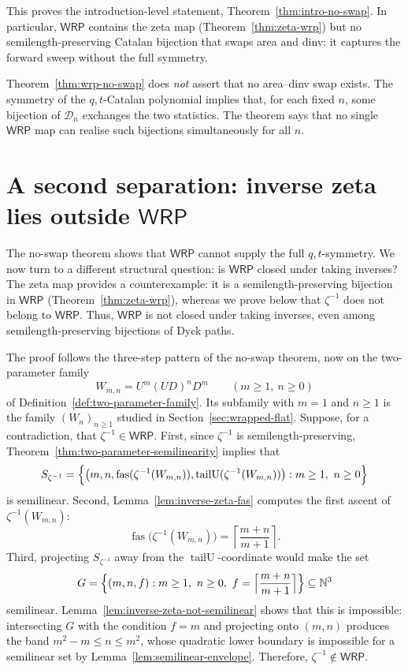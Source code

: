 \documentclass[11pt]{article}
\theoremstyle{definition}
\newcommand{\D}{\mathcal D}
\newcommand{\N}{\mathbb N}
\newcommand{\WRP}{\mathsf{WRP}}
\newcommand{\fas}{\operatorname{fas}}
\newcommand{\tailU}{\operatorname{tailU}}
\begin{document}
This proves the introduction-level statement, Theorem~\ref{thm:intro-no-swap}.
In particular, $\WRP$ contains the zeta map (Theorem~\ref{thm:zeta-wrp}) but no
semilength-preserving Catalan bijection that swaps area and dinv: it captures the
forward sweep without the full symmetry.

Theorem~\ref{thm:wrp-no-swap} does \emph{not} assert that no area--dinv
swap exists.  The symmetry of the $q,t$-Catalan polynomial implies that, for
each fixed $n$, some bijection of $\D_n$ exchanges the two statistics.  The
theorem says that no single $\WRP$ map can realise such bijections
simultaneously for all $n$.

\section[Inverse zeta lies outside WRP]
{A second separation: inverse zeta lies outside $\WRP$}
\label{sec:inverse-zeta}

The no-swap theorem shows that $\WRP$ cannot supply the full
$q,t$-symmetry.  We now turn to a different structural question: is $\WRP$
closed under taking inverses?  The zeta map provides a counterexample: it is a
semilength-preserving bijection in $\WRP$ (Theorem~\ref{thm:zeta-wrp}), whereas we
prove below that $\zeta^{-1}$ does not belong to $\WRP$.  Thus, $\WRP$ is not
closed under taking inverses, even among semilength-preserving bijections of Dyck
paths.

The proof follows the three-step pattern of the no-swap theorem, now on the
two-parameter family
\[
   W_{m,n}=U^m(UD)^nD^m\qquad(m\ge 1,\ n\ge 0)
\]
of Definition~\ref{def:two-parameter-family}.  Its subfamily with $m=1$ and $n\ge1$ is
the family $(W_n)_{n\ge1}$ studied in
Section~\ref{sec:wrapped-flat}.  Suppose, for a contradiction, that
$\zeta^{-1}\in\WRP$.  First, since $\zeta^{-1}$ is semilength-preserving,
Theorem~\ref{thm:two-parameter-semilinearity} implies that
\[
   S_{\zeta^{-1}}
   =\Bigl\{\bigl(m,n,\fas(\zeta^{-1}(W_{m,n})),
                    \tailU(\zeta^{-1}(W_{m,n}))\bigr):
                    m\ge1,\ n\ge0\Bigr\}
\]
is semilinear.  Second, Lemma~\ref{lem:inverse-zeta-fas} computes the first
ascent of $\zeta^{-1}(W_{m,n})$:
\[
   \fas\bigl(\zeta^{-1}(W_{m,n})\bigr)=\left\lceil\frac{m+n}{m+1}\right\rceil.
\]
Third, projecting $S_{\zeta^{-1}}$ away from the $\tailU$-coordinate would make
the set
\[
   G=\Bigl\{(m,n,f):m\ge1,\ n\ge0,\
          f=\Bigl\lceil\frac{m+n}{m+1}\Bigr\rceil\Bigr\}\subseteq\N^3
\]
semilinear.  Lemma~\ref{lem:inverse-zeta-not-semilinear} shows that this is impossible:
intersecting $G$ with the condition $f=m$ and projecting onto $(m,n)$ produces
the band $m^2-m\le n\le m^2$, whose quadratic lower boundary is impossible for
a semilinear set by Lemma~\ref{lem:semilinear-envelope}.  Therefore,
$\zeta^{-1}\notin\WRP$.
\end{document}

